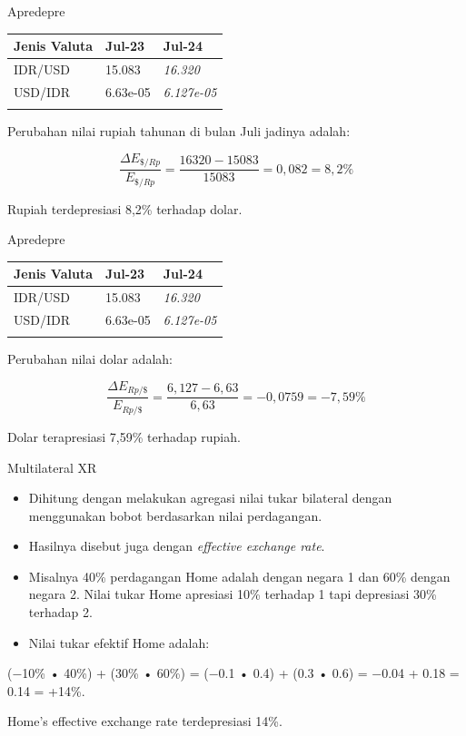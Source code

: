 \documentclass[
  ignorenonframetext,
]{beamer}
\begin{document}
\begin{frame}{Apredepre}
\label{apredepre-1}
\begin{longtable}[]{@{}lll@{}}
\toprule\noalign{}
Jenis Valuta & Jul-23 & Jul-24 \\
\midrule\noalign{}
\endhead
IDR/USD & 15.083 & \emph{16.320} \\
USD/IDR & 6.63e-05 & \emph{6.127e-05} \\
\bottomrule\noalign{}
\end{longtable}

Perubahan nilai rupiah tahunan di bulan Juli jadinya adalah:

\[
\frac{\Delta E_{\$/Rp}}{E_{\$/Rp}}=\frac{16320-15083}{15083}=0,082=8,2\%
\]

Rupiah terdepresiasi 8,2\% terhadap dolar.
\end{frame}

\begin{frame}{Apredepre}
\label{apredepre-2}
\begin{longtable}[]{@{}lll@{}}
\toprule\noalign{}
Jenis Valuta & Jul-23 & Jul-24 \\
\midrule\noalign{}
\endhead
IDR/USD & 15.083 & \emph{16.320} \\
USD/IDR & 6.63e-05 & \emph{6.127e-05} \\
\bottomrule\noalign{}
\end{longtable}

Perubahan nilai dolar adalah:

\[
\frac{\Delta E_{Rp/\$}}{E_{Rp/\$}}=\frac{6,127-6,63}{6,63}=-0,0759=-7,59\%
\]

Dolar terapresiasi 7,59\% terhadap rupiah.
\end{frame}

\begin{frame}{Multilateral XR}
\label{multilateral-xr}
\begin{itemize}
\item
  Dihitung dengan melakukan agregasi nilai tukar bilateral dengan
  menggunakan bobot berdasarkan nilai perdagangan.
\item
  Hasilnya disebut juga dengan \emph{effective exchange rate}.
\item
  Misalnya 40\% perdagangan Home adalah dengan negara 1 dan 60\% dengan
  negara 2. Nilai tukar Home apresiasi 10\% terhadap 1 tapi depresiasi
  30\% terhadap 2.
\item
  Nilai tukar efektif Home adalah:
\end{itemize}

(−10\% • 40\%) + (30\% • 60\%) = (−0.1 • 0.4) + (0.3 • 0.6) = −0.04 +
0.18 = 0.14 = +14\%.

Home's effective exchange rate terdepresiasi 14\%.
\end{frame}
\end{document}
